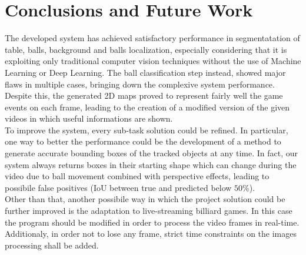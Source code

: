 \section{Conclusions and Future Work}


The developed system has achieved satisfactory performance in segmentatation of table, balls, background and balls localization, especially considering 
that it is exploiting only traditional computer vision techniques without the use of Machine Learning or Deep Learning.
The ball classification step instead, showed major flaws in multiple cases, bringing down the complexive system performance. 
Despite this, the generated 2D maps proved to represent fairly well the game events on each frame, leading to the creation of a modified version
of the given videos in which useful informations are shown. 
\newline \\
To improve the system, every sub-task solution could be refined.
In particular, one way to better the performance could be the development of a method to generate accurate bounding boxes
of the tracked objects at any time. In fact, our system always returns boxes in their starting shape which can change during the video due to ball
movement combined with perspective effects, leading to possibile false positives (IoU between true and predicted below $50\%$).
\newline \\
Other than that, another possibile way in which the project solution could be further improved is the adaptation to live-streaming billiard games. In this case the program should be modified
in order to process the video frames in real-time. Additionaly, in order not to lose any frame, strict time constraints on the images processing shall be added. 
